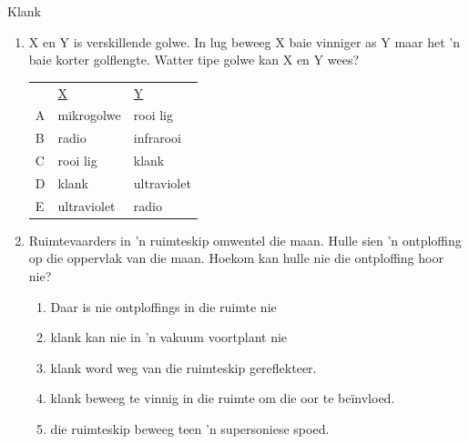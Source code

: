 \begin{eocexercises}{Klank}
\begin{enumerate}[noitemsep, label=\textbf{\arabic*}. ]
\item X en Y is verskillende golwe. In lug beweeg X baie vinniger as Y maar het 'n baie korter golflengte. Watter tipe golwe kan X en Y wees? 
          \begin{table}[H]
        \begin{center}
       \begin{tabular}[t]{|l|l|l|}\hline
         &
        \uline{X} &
        \uline{Y}%
     \tabularnewline\cline{1-1}\cline{2-2}\cline{3-3}
        A &
        mikrogolwe &
        rooi lig%
     \tabularnewline\cline{1-1}\cline{2-2}\cline{3-3}
        B &
        radio &
        infrarooi%
     \tabularnewline\cline{1-1}\cline{2-2}\cline{3-3}
        C &
        rooi lig &
        klank%
     \tabularnewline\cline{1-1}\cline{2-2}\cline{3-3}
        D &
        klank &
        ultraviolet%
     \tabularnewline\cline{1-1}\cline{2-2}\cline{3-3}
        E &
        ultraviolet &
        radio%
     \tabularnewline\cline{1-1}\cline{2-2}\cline{3-3}
    \end{tabular}
      \end{center}
\end{table}
    \par

\item Ruimtevaarders in 'n ruimteskip omwentel die maan. Hulle sien 'n ontploffing op die oppervlak van die maan. Hoekom kan hulle nie die ontploffing hoor nie?
\begin{enumerate}[noitemsep, label=\textbf{\alph*}. ] 
    \item Daar is nie ontploffings in die ruimte nie
    \item klank kan nie in 'n vakuum voortplant nie
    \item klank word weg van die ruimteskip gereflekteer.
    \item klank beweeg te vinnig in die ruimte om die oor te be\"invloed.
    \item die ruimteskip beweeg teen 'n supersoniese spoed.
\end{enumerate}


\end{enumerate}
\end{eocexercises}
